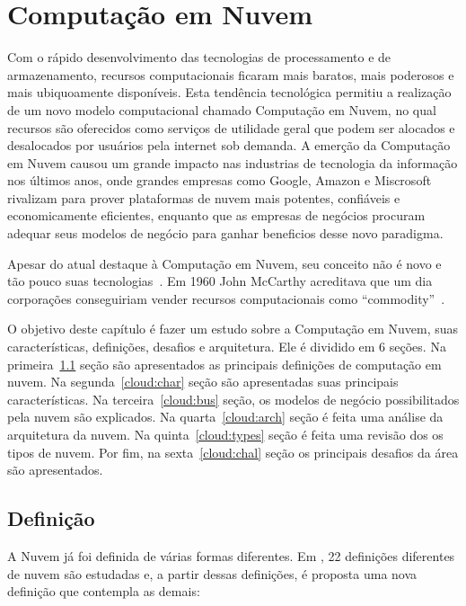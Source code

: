 \chapter{Computação em Nuvem}

Com o rápido desenvolvimento das tecnologias de processamento e de armazenamento, recursos computacionais ficaram mais baratos, mais poderosos e mais ubiquoamente disponíveis. Esta tendência tecnológica permitiu a realização de um novo modelo computacional chamado Computação em Nuvem, no qual recursos são oferecidos como serviços de utilidade geral que podem ser alocados e desalocados por usuários pela internet sob demanda. A emerção da Computação em Nuvem causou um grande impacto nas industrias de tecnologia da informação nos últimos anos, onde grandes empresas como Google, Amazon e Miscrosoft rivalizam para prover plataformas de nuvem mais potentes, confiáveis e economicamente eficientes, enquanto que as empresas de negócios procuram adequar seus modelos de negócio para ganhar beneficios desse novo paradigma.

Apesar do atual destaque à Computação em Nuvem,
 seu conceito não é novo e tão pouco suas
tecnologias~\cite{CloudUncovered:2012}. Em 1960 John McCarthy acreditava que um dia corporações conseguiriam vender recursos computacionais como ``commodity''~\cite{demystifingCloud:2011}.

O objetivo deste capítulo é fazer um estudo sobre a Computação em Nuvem, suas características, definições, desafios e arquitetura. Ele é dividido em 6 seções. Na primeira~\ref{cloud:def} seção são apresentados as
principais definições de computação em nuvem. Na segunda~\ref{cloud:char} seção são
apresentadas suas principais características. Na terceira~\ref{cloud:bus} seção, os modelos de
negócio possibilitados pela nuvem são explicados. Na quarta~\ref{cloud:arch} seção é feita uma
análise da arquitetura da nuvem. Na quinta~\ref{cloud:types} seção é feita uma revisão dos os
tipos de nuvem. Por fim, na sexta~\ref{cloud:chal} seção os principais desafios da área são
apresentados.

\section{Definição} \label{cloud:def}

A Nuvem já foi definida de várias formas diferentes. Em
\cite{CloudDefinition:2009} , 22  definições diferentes de nuvem são estudadas e, a partir dessas definições, é proposta uma nova definição que contempla as demais:
	
